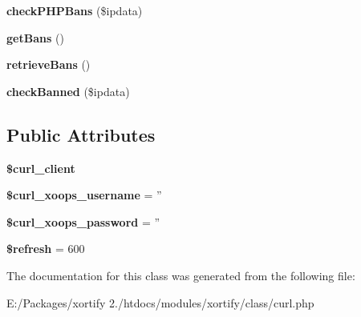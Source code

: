 \begin{DoxyCompactItemize}
\item 
\hypertarget{class_c_u_r_l_xortify_exchange_af7070ec0dd7e10f2245ee61493232545}{{\bfseries check\-P\-H\-P\-Bans} (\$ipdata)}\label{class_c_u_r_l_xortify_exchange_af7070ec0dd7e10f2245ee61493232545}

\item 
\hypertarget{class_c_u_r_l_xortify_exchange_ab16e33134365a9f5e81f903181e4b02f}{{\bfseries get\-Bans} ()}\label{class_c_u_r_l_xortify_exchange_ab16e33134365a9f5e81f903181e4b02f}

\item 
\hypertarget{class_c_u_r_l_xortify_exchange_a371fa06384f7dc24403f6bfd6e6829e7}{{\bfseries retrieve\-Bans} ()}\label{class_c_u_r_l_xortify_exchange_a371fa06384f7dc24403f6bfd6e6829e7}

\item 
\hypertarget{class_c_u_r_l_xortify_exchange_a88c3dc6fdb84cee28548278a973ee2df}{{\bfseries check\-Banned} (\$ipdata)}\label{class_c_u_r_l_xortify_exchange_a88c3dc6fdb84cee28548278a973ee2df}

\end{DoxyCompactItemize}
\subsection*{Public Attributes}
\begin{DoxyCompactItemize}
\item 
\hypertarget{class_c_u_r_l_xortify_exchange_a807f4adb89c5b11e2eedb8a1447be62b}{{\bfseries \$curl\-\_\-client}}\label{class_c_u_r_l_xortify_exchange_a807f4adb89c5b11e2eedb8a1447be62b}

\item 
\hypertarget{class_c_u_r_l_xortify_exchange_a3049ba20cd47f4545ad2174791f4d6fd}{{\bfseries \$curl\-\_\-xoops\-\_\-username} = ''}\label{class_c_u_r_l_xortify_exchange_a3049ba20cd47f4545ad2174791f4d6fd}

\item 
\hypertarget{class_c_u_r_l_xortify_exchange_a3e18f92cce10d0f9c591e7fededc8f32}{{\bfseries \$curl\-\_\-xoops\-\_\-password} = ''}\label{class_c_u_r_l_xortify_exchange_a3e18f92cce10d0f9c591e7fededc8f32}

\item 
\hypertarget{class_c_u_r_l_xortify_exchange_abd144396bf1953b9ccc48f1333091fc8}{{\bfseries \$refresh} = 600}\label{class_c_u_r_l_xortify_exchange_abd144396bf1953b9ccc48f1333091fc8}

\end{DoxyCompactItemize}


The documentation for this class was generated from the following file\-:\begin{DoxyCompactItemize}
\item 
E\-:/\-Packages/xortify 2./htdocs/modules/xortify/class/curl.\-php\end{DoxyCompactItemize}

